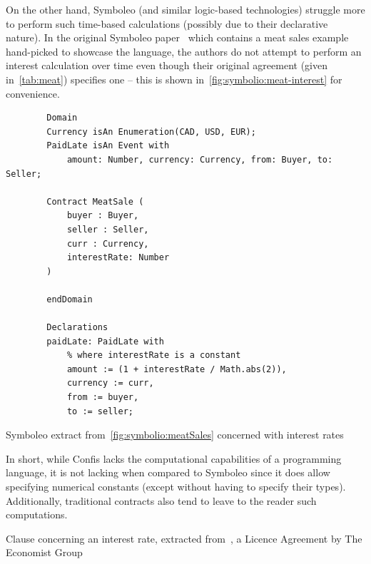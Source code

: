 On the other hand, Symboleo (and similar logic-based technologies) struggle more to perform such time-based calculations (possibly due to their declarative nature).
In the original Symboleo paper~\cite{symboleo2020} which contains a meat sales example hand-picked to showcase the language, the authors do not attempt to perform an interest calculation over time even though their original agreement (given in~\autoref{tab:meat}) specifies one -- this is shown in~\autoref{fig:symbolio:meat-interest} for convenience.

\begin{listing}[h]
    \centering
    \begin{minipage}{0.85\textwidth}
        \begin{verbatim}
        Domain
        Currency isAn Enumeration(CAD, USD, EUR);
        PaidLate isAn Event with
            amount: Number, currency: Currency, from: Buyer, to: Seller;

        Contract MeatSale (
            buyer : Buyer,
            seller : Seller,
            curr : Currency,
            interestRate: Number
        )

        endDomain

        Declarations
        paidLate: PaidLate with
            % where interestRate is a constant
            amount := (1 + interestRate / Math.abs(2)),
            currency := curr,
            from := buyer,
            to := seller;
        \end{verbatim}
    \end{minipage}
    \caption{Symboleo extract from~\autoref{fig:symbolio:meatSales} concerned with interest rates}
    \label{fig:symbolio:meat-interest}
\end{listing}

In short, while Confis lacks the computational capabilities of a programming language, it is not lacking when compared to Symboleo since it does allow specifying numerical constants (except without having to specify their types).
Additionally, traditional contracts also tend to leave to the reader such computations.

\begin{table}[h]
    \centering
    \setlength{\fboxsep}{10pt}
    \caption[The Econoimist licence interest rate clause]{Clause concerning an interest rate, extracted from~\cite{economistIU2016licence}, a Licence Agreement by The Economist Group}
    \label{tab:economist-interest}
\end{table}

